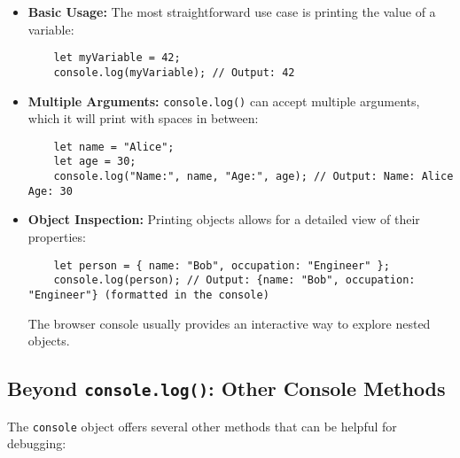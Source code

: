 \documentclass{article}
\begin{document}
{{{{\begin{itemize}
    \item \textbf{Basic Usage:}  The most straightforward use case is printing the value of a variable:
    \begin{verbatim}
    let myVariable = 42;
    console.log(myVariable); // Output: 42
    \end{verbatim}
    \item \textbf{Multiple Arguments:}  \texttt{console.log()} can accept multiple arguments, which it will print with spaces in between:
    \begin{verbatim}
    let name = "Alice";
    let age = 30;
    console.log("Name:", name, "Age:", age); // Output: Name: Alice Age: 30
    \end{verbatim}
    \item \textbf{Object Inspection:}  Printing objects allows for a detailed view of their properties:
    \begin{verbatim}
    let person = { name: "Bob", occupation: "Engineer" };
    console.log(person); // Output: {name: "Bob", occupation: "Engineer"} (formatted in the console)
    \end{verbatim}  The browser console usually provides an interactive way to explore nested objects.
\end{itemize}

\subsection*{Beyond \texttt{console.log()}: Other Console Methods}

The \texttt{console} object offers several other methods that can be helpful for debugging:

}}}}
\end{document}
